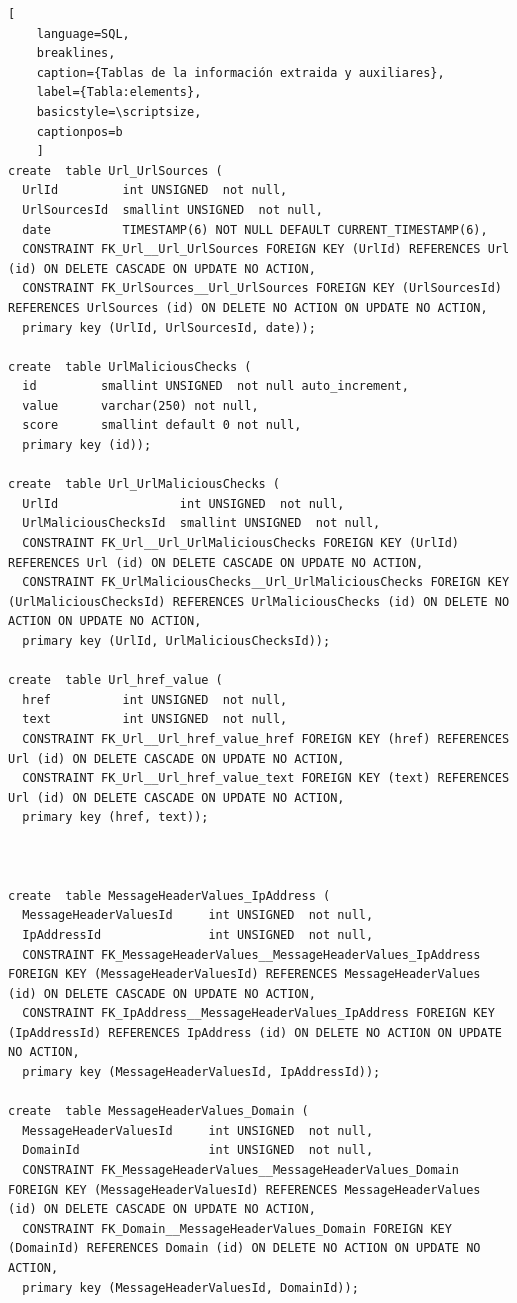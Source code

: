 \begin{lstlisting}[
    language=SQL,
    breaklines, 
    caption={Tablas de la información extraida y auxiliares}, 
    label={Tabla:elements}, 
    basicstyle=\scriptsize,
    captionpos=b
    ]
create  table Url_UrlSources (
  UrlId         int UNSIGNED  not null, 
  UrlSourcesId  smallint UNSIGNED  not null,
  date          TIMESTAMP(6) NOT NULL DEFAULT CURRENT_TIMESTAMP(6),
  CONSTRAINT FK_Url__Url_UrlSources FOREIGN KEY (UrlId) REFERENCES Url (id) ON DELETE CASCADE ON UPDATE NO ACTION,
  CONSTRAINT FK_UrlSources__Url_UrlSources FOREIGN KEY (UrlSourcesId) REFERENCES UrlSources (id) ON DELETE NO ACTION ON UPDATE NO ACTION,
  primary key (UrlId, UrlSourcesId, date));

create  table UrlMaliciousChecks (
  id         smallint UNSIGNED  not null auto_increment, 
  value      varchar(250) not null, 
  score      smallint default 0 not null, 
  primary key (id));

create  table Url_UrlMaliciousChecks (
  UrlId                 int UNSIGNED  not null, 
  UrlMaliciousChecksId  smallint UNSIGNED  not null,
  CONSTRAINT FK_Url__Url_UrlMaliciousChecks FOREIGN KEY (UrlId) REFERENCES Url (id) ON DELETE CASCADE ON UPDATE NO ACTION,
  CONSTRAINT FK_UrlMaliciousChecks__Url_UrlMaliciousChecks FOREIGN KEY (UrlMaliciousChecksId) REFERENCES UrlMaliciousChecks (id) ON DELETE NO ACTION ON UPDATE NO ACTION,
  primary key (UrlId, UrlMaliciousChecksId));
  
create  table Url_href_value (
  href          int UNSIGNED  not null, 
  text          int UNSIGNED  not null, 
  CONSTRAINT FK_Url__Url_href_value_href FOREIGN KEY (href) REFERENCES Url (id) ON DELETE CASCADE ON UPDATE NO ACTION,
  CONSTRAINT FK_Url__Url_href_value_text FOREIGN KEY (text) REFERENCES Url (id) ON DELETE CASCADE ON UPDATE NO ACTION,
  primary key (href, text));



create  table MessageHeaderValues_IpAddress (
  MessageHeaderValuesId     int UNSIGNED  not null, 
  IpAddressId               int UNSIGNED  not null,
  CONSTRAINT FK_MessageHeaderValues__MessageHeaderValues_IpAddress FOREIGN KEY (MessageHeaderValuesId) REFERENCES MessageHeaderValues (id) ON DELETE CASCADE ON UPDATE NO ACTION,
  CONSTRAINT FK_IpAddress__MessageHeaderValues_IpAddress FOREIGN KEY (IpAddressId) REFERENCES IpAddress (id) ON DELETE NO ACTION ON UPDATE NO ACTION,
  primary key (MessageHeaderValuesId, IpAddressId));

create  table MessageHeaderValues_Domain (
  MessageHeaderValuesId     int UNSIGNED  not null, 
  DomainId                  int UNSIGNED  not null,
  CONSTRAINT FK_MessageHeaderValues__MessageHeaderValues_Domain FOREIGN KEY (MessageHeaderValuesId) REFERENCES MessageHeaderValues (id) ON DELETE CASCADE ON UPDATE NO ACTION,
  CONSTRAINT FK_Domain__MessageHeaderValues_Domain FOREIGN KEY (DomainId) REFERENCES Domain (id) ON DELETE NO ACTION ON UPDATE NO ACTION,
  primary key (MessageHeaderValuesId, DomainId));


\end{lstlisting}
